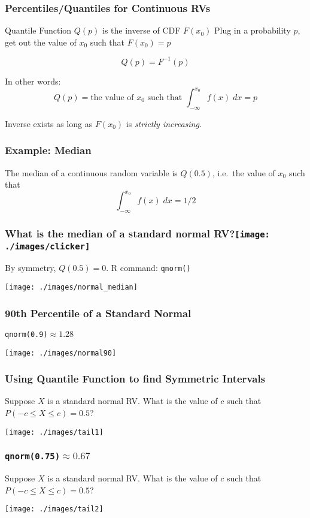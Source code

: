 \begin{frame}
\frametitle{Percentiles/Quantiles for Continuous RVs}
\begin{block}{Quantile Function $Q(p)$ is the inverse of CDF $F(x_0)$}
Plug in a probability $p$, get out the value of $x_0$ such that $F(x_0)=p$
\end{block}
$$Q(p) = F^{-1}(p)$$

In other words:
	$$Q(p) = \mbox{the value of } x_0 \mbox{ such that } \int_{-\infty}^{x_0} f(x) \; dx = p$$
	
\begin{alertblock}{Inverse exists as long as $F(x_0)$ is \emph{strictly increasing}.} \end{alertblock}	
	
\end{frame}
\begin{frame}
\frametitle{Example: Median}
The median of a continuous random variable is $Q(0.5)$, i.e.\ the value of $x_0$ such that 
	$$\int_{-\infty}^{x_0} f(x)\; dx = 1/2$$
\end{frame}
\begin{frame}
\frametitle{What is the median of a standard normal RV?\hfill \texttt{[image: ./images/clicker]}}
\pause
By symmetry, $Q(0.5) = 0$. R command: \texttt{qnorm()}
\begin{center}
\texttt{[image: ./images/normal\_median]}
\end{center}
\end{frame}
\begin{frame}
\frametitle{90th Percentile of a Standard Normal}
\texttt{qnorm(0.9)}$\approx 1.28$
\begin{center}
\texttt{[image: ./images/normal90]}
\end{center}
\end{frame}

\begin{frame}
\frametitle{Using Quantile Function to find Symmetric Intervals}
Suppose $X$ is a standard normal RV. What is the value of $c$ such that $P(-c \leq X\leq c ) = 0.5$?
\begin{center}
\texttt{[image: ./images/tail1]}
\end{center}
\end{frame}

\begin{frame}
\frametitle{\texttt{qnorm(0.75)}$\approx 0.67$}
Suppose $X$ is a standard normal RV. What is the value of $c$ such that $P(-c \leq X\leq c ) = 0.5$?
\begin{center}
\texttt{[image: ./images/tail2]}
\end{center}
\end{frame}


